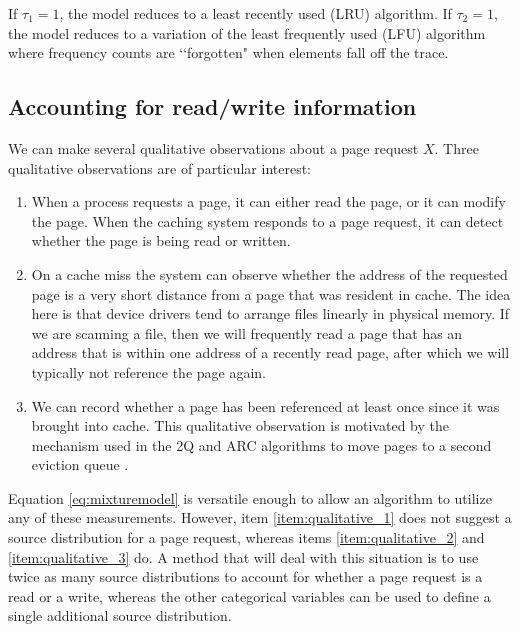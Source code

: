  If $\tau_1 = 1$, the model reduces to a least recently used (LRU)
  algorithm. If $\tau_2 = 1$, the model reduces to a variation of the least
  frequently used (LFU) algorithm where frequency counts are \lq\lq forgotten" when
  elements fall off the trace.

\subsection{Accounting for read/write information}
\label{sec:accounting_for_rw}
  We can make several qualitative observations about a page request $X$.
  Three qualitative observations are of particular interest:

  \begin{enumerate}
  \item
  \label{item:qualitative_1}
  When a process requests a page, it can either read the page, or it can modify
  the page. When the caching system responds to a page request, it can detect
  whether the page is being read or written.

  \item
  \label{item:qualitative_2}
  On a cache miss the system can observe whether the address of the requested
  page is a very short distance from a page that was resident in cache. The
  idea here is that device drivers tend to arrange files linearly in physical
  memory. If we are scanning a file, then we will frequently read a page that
  has an address that is within one address of a recently read page, after
  which we will typically not reference the page again.

  \item
  \label{item:qualitative_3}
  We can record whether a page has been referenced at least once since it was
  brought into cache. This qualitative observation is motivated by the mechanism
  used in the 2Q and ARC algorithms to move pages to a second eviction queue
  \cite{arc, johnson1994x3}.
  \end{enumerate}

  Equation \ref{eq:mixturemodel} is versatile enough to allow an algorithm to
  utilize any of these measurements. However, item \ref{item:qualitative_1}
  does not suggest a source distribution for a page request, whereas items
  \ref{item:qualitative_2} and \ref{item:qualitative_3} do. A method that will
  deal with this situation is to use twice as many source distributions to
  account for whether a page request is a read or a write, whereas the other
  categorical variables can be used to define a single additional source
  distribution.

